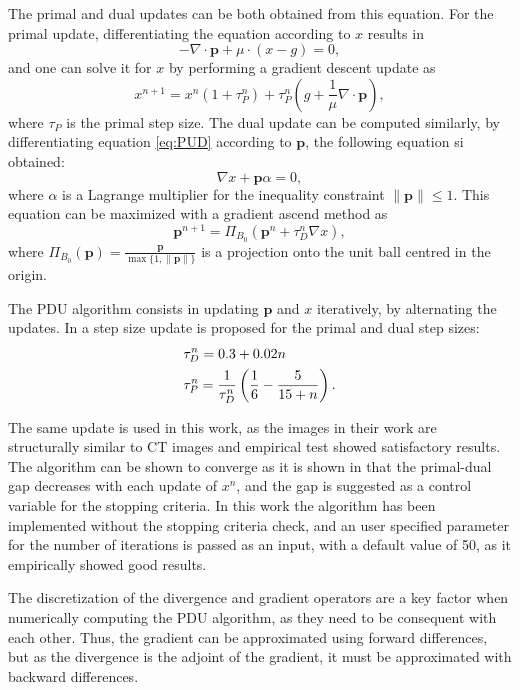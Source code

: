 The primal and dual updates can be both obtained from this equation. For the primal update, differentiating the equation according to $x$ results in
\begin{equation}
- \nabla \cdot\textbf{p}+\mu\cdot(x-g)=0,
\end{equation}
and one can solve it for $x$ by performing a gradient descent update as
\begin{equation}
x^{n+1}=x^n(1+\tau_P^n)+\tau_P^n\left(g+\frac{1}{\mu} \nabla \cdot \textbf{p}\right),
\end{equation}
where $\tau_P$ is the primal step size. The dual update can be computed similarly, by differentiating equation \ref{eq:PUD} according to $\textbf{p}$, the following equation si obtained:
\begin{equation}
\nabla x+\textbf{p}\alpha=0,
\end{equation}
where $\alpha$ is a Lagrange multiplier for the inequality constraint $\lVert\textbf{p}\rVert\leq 1$. This equation can be maximized with a gradient ascend method as
\begin{equation}
\textbf{p}^{n+1}=\Pi_{B_0}\left(\textbf{p}^{n} +\tau_D^n\nabla x\right),
\end{equation}
where $\Pi_{B_0}(\textbf{p})=\frac{\textbf{p}}{\max\{1,\lVert\textbf{p}\rVert\}}$ is a projection onto the unit ball centred in the origin.

The PDU algorithm consists in updating $\textbf{p}$ and $x$ iteratively, by alternating the updates. In \cite{zhu2008efficient}\cite{knoll2010fast} a step size update is proposed for the primal and dual step sizes:
\begin{align}
&\tau_D^n=0.3+0.02n \notag \\
&\tau_P^n=\frac{1}{\tau_D^n}\left(\frac{1}{6}-\frac{5}{15+n}\right).
\end{align}

The same update is used in this work, as the images in their work are structurally similar to CT images and empirical test showed satisfactory results. The algorithm can be shown to converge as it is shown in \cite{zhu2010duality} that the primal-dual gap decreases with each update of $x^n$, and the gap is suggested as a control variable for the stopping criteria. In this work the algorithm has been implemented without the stopping criteria check, and an user specified parameter for the number of iterations is passed as an input, with a default value of 50, as it empirically showed good results.

The discretization of the divergence and gradient operators are a key factor when numerically computing the PDU algorithm, as they need to be consequent with each other. Thus, the gradient can be approximated using forward differences, but as the divergence is the adjoint of the gradient, it must be approximated with backward differences.






